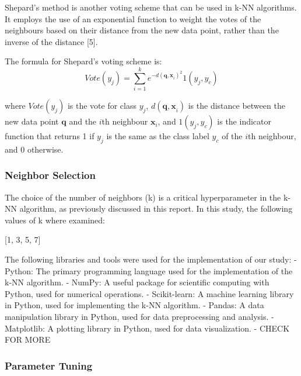 Shepard's method is another voting scheme that can be used in k-NN algorithms. 
It employs the use of an exponential function to weight the votes of the neighbours based on their distance from the new data point,
rather than the inverse of the distance [5].

The formula for Shepard's voting scheme is:
\begin{equation} 
    Vote(y_j)=\sum_{i=1}^k e^{-d(\mathbf{q,x}_i)^2}1(y_j,y_c)
\end{equation}

where \(Vote(y_j)\) is the vote for class \(y_j\), \(d(\mathbf{q,x}_i)\) is the
distance between the new data point \(\mathbf{q}\) and the \(i\)th neighbour \(\mathbf{x}_i\),
and \(1(y_j,y_c)\) is the indicator function that returns 1 if \(y_j\) is the same as
the class label \(y_c\) of the \(i\)th neighbour, and 0 otherwise.\\

\subsubsection*{Neighbor Selection}
The choice of the number of neighbors (k) is a critical hyperparameter in the k-NN algorithm, as previously discussed in this report.
In this study, the following values of k where examined:

[1, 3, 5, 7]




The following libraries and tools were used for the implementation of our study:
- Python: The primary programming language used for the implementation of the k-NN algorithm.
- NumPy: A useful package for scientific computing with Python, used for numerical operations.
- Scikit-learn: A machine learning library in Python, used for implementing the k-NN algorithm.
- Pandas: A data manipulation library in Python, used for data preprocessing and analysis.
- Matplotlib: A plotting library in Python, used for data visualization.
- CHECK FOR MORE


\subsubsection{Parameter Tuning}




